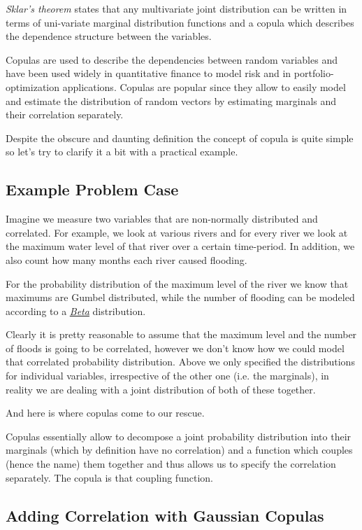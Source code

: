 \emph{Sklar's theorem} states that any multivariate joint distribution
can be written in terms of uni-variate marginal distribution functions
and a copula which describes the dependence structure between the
variables.

Copulas are used to describe the dependencies between random variables and
have been used widely in quantitative finance to model risk and in portfolio-optimization 
applications. Copulas are popular since
they allow to easily model and estimate the distribution of random
vectors by estimating marginals and their correlation separately.

Despite the obscure and daunting definition the concept of copula is
quite simple so let's try to clarify it a bit with a practical example.

\subsection{Example Problem Case}\label{example-problem-case}

Imagine we measure two variables that are non-normally distributed and
correlated. For example, we look at various rivers and for every river
we look at the maximum water level of that river over a certain
time-period. In addition, we also count how many months each river
caused flooding.

For the probability distribution of the maximum level of the river we
know that maximums are Gumbel distributed, while the number of flooding
can be modeled according to a
\href{https://en.wikipedia.org/wiki/Beta_distribution}{\emph{Beta}}
distribution.

Clearly it is pretty reasonable to assume that the maximum level and the
number of floods is going to be correlated, however we don't know how
we could model that correlated probability distribution. Above we only
specified the distributions for individual variables, irrespective of
the other one (i.e. the marginals), in reality we are dealing with a
joint distribution of both of these together.

And here is where copulas come to our rescue.

Copulas essentially allow to decompose a joint probability distribution
into their marginals (which by definition have no correlation) and a
function which couples (hence the name) them together and thus allows us
to specify the correlation separately. The copula is that coupling
function.

\subsection{Adding Correlation with Gaussian Copulas}\label{adding-correlation-with-gaussian-copulas}

